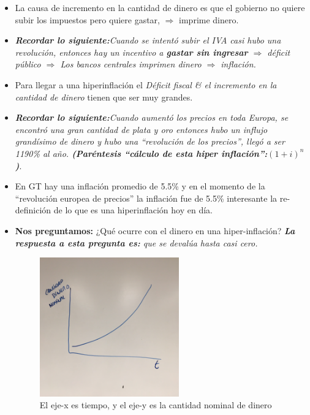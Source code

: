 \begin{enumerate}
\begin{itemize}
            
            \item La causa de incremento en la cantidad de dinero es que el gobierno no quiere subir los impuestos pero quiere gastar, $\Rightarrow$ imprime dinero.
            \item \emph{\textbf{Recordar lo siguiente:}Cuando se intentó subir el IVA casi hubo una revolución, entonces hay un incentivo a \textbf{gastar sin ingresar} $\Rightarrow$ déficit público $\Rightarrow$ Los bancos centrales imprimen dinero $\Rightarrow$ inflación.}
            \item Para llegar a una hiperinflación el \emph{Déficit fiscal \& el incremento en la cantidad de dinero} tienen que ser muy grandes.
            \item \emph{\textbf{Recordar lo siguiente:}Cuando aumentó los precios en toda Europa, se encontró una gran cantidad de plata y oro entonces hubo un influjo grandísimo de dinero y hubo una ``revolución de los precios'', llegó a ser 1190\% al año. \emph{\textbf{(Paréntesis ``cálculo de esta hiper inflación'':}$(1 + i)^{n}$\textbf{)}}}.
            \item En GT hay una inflación promedio de 5.5\% y en el momento de la ``revolución europea de precios'' la inflación fue de 5.5\% interesante la re-definición de lo que es una hiperinflación hoy en día. 
            \item \textbf{Nos preguntamos:} ¿Qué ocurre con el dinero en una hiper-inflación? \emph{\textbf{La respuesta a esta pregunta es: } que se devalúa hasta casi cero.}
                \begin{figure}[htbp]
                    \centering
                    \includegraphics[width=6cm]{Classes/Images/2019-10-09_1.JPG}
                    \caption{El eje-x es tiempo, y el eje-y es la cantidad nominal de dinero}
                    \label{}
                \end{figure} 
                \begin{figure}[htbp]

\end{figure}
\end{itemize}
\end{enumerate}
